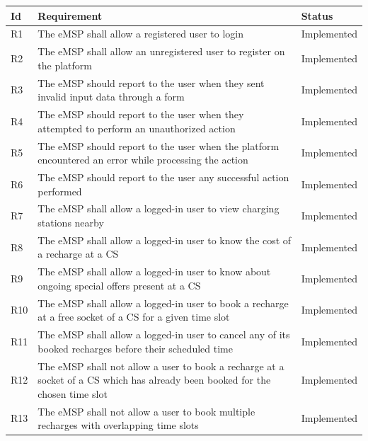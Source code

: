 \documentclass[11pt]{article}
\begin{document}
\begin{table}[H]
    \centering
    \setlength{\tabcolsep}{18pt}
    \renewcommand{\arraystretch}{1.2}
    \begin{tabularx}{\textwidth}{|>{\centering\hsize=0.15\hsize}X|>{\hsize=1.425\hsize}X|>{\hsize=1.425\hsize}X|}
        \hline
        \textbf{Id} & \textbf{Requirement} & \textbf{Status} \\
        \hline
        R1 & The eMSP shall allow a registered user to login & Implemented \\
        \hline
        R2 & The eMSP shall allow an unregistered user to register on the platform & Implemented \\
        \hline
        R3 & The eMSP should report to the user when they sent invalid input data through a form & Implemented \\
        \hline
        R4 & The eMSP should report to the user when they attempted to perform an unauthorized action & Implemented \\
        \hline
        R5 & The eMSP should report to the user when the platform encountered an error while processing the action & Implemented \\
        \hline
        R6 & The eMSP should report to the user any successful action performed & Implemented \\
        \hline
        R7 & The eMSP shall allow a logged-in user to view charging stations nearby & Implemented \\
        \hline
        R8 & The eMSP shall allow a logged-in user to know the cost of a recharge at a CS & Implemented \\
        \hline
        R9 & The eMSP shall allow a logged-in user to know about ongoing special offers present at a CS & Implemented \\
        \hline
        R10 & The eMSP shall allow a logged-in user to book a recharge at a free socket of a CS for a given time slot & Implemented \\
        \hline
        R11 & The eMSP shall allow a logged-in user to cancel any of its booked recharges before their scheduled time & Implemented \\
        \hline
        R12 & The eMSP shall not allow a user to book a recharge at a socket of a CS which has already been booked for the chosen time slot & Implemented \\
        \hline
        R13 & The eMSP shall not allow a user to book multiple recharges with overlapping time slots & Implemented \\

\end{tabularx}
\end{table}
\end{document}
